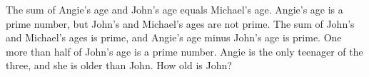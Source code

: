 The sum of Angie's age and John's age equals Michael's age. Angie's age is a prime number, but John's and Michael's ages are not prime. The sum of John's and Michael's ages is prime, and Angie's age minus John's age is prime. One more than half of John's age is a prime number. Angie is the only teenager of the three, and she is older than John. How old is John?
